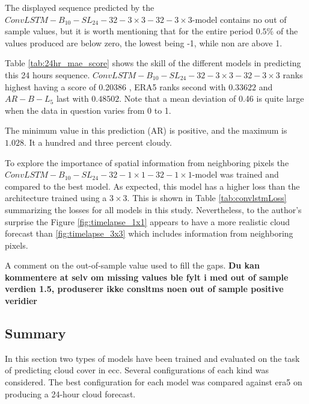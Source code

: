 The displayed sequence predicted by the $ConvLSTM-B_{10}-SL_{24}-32-3\times3-32-3 \times3$-model contains no out of sample values, but it is worth mentioning that for the entire period $0.5\%$ of the values produced are below zero, the lowest being -1, while non are above 1. 

Table \ref{tab:24hr_mae_score} shows the skill of the different models in predicting this 24 hours sequence. $ConvLSTM-B_{10}-SL_{24}-32-3\times3-32-3\times3$ ranks highest having a score of 0.20386
, ERA5 ranks second with  $0.33622$ and $AR-B-L_5$ last with  $0.48502$. Note that a mean deviation of 0.46 is quite large when the data in question varies from 0 to 1. 


The minimum value in this prediction (AR) is positive, and the maximum is $1.028$. It a hundred and three percent cloudy. 

To explore the importance of spatial information from neighboring pixels the $ConvLSTM-B_{10}-SL_{24}-32-1\times1-32-1 \times1$-model was trained and compared to the best model. As expected, this model has a higher loss than the architecture trained using a $3\times 3$. This is shown in Table \ref{tab:convlstmLoss} summarizing the losses for all models in this study. Nevertheless, to the author's surprise the Figure \ref{fig:timelapse_1x1} appears to have a more realistic cloud forecast than \ref{fig:timelapse_3x3} which includes information from neighboring pixels. 


A comment on the out-of-sample value used to fill the gaps.
\textbf{Du kan kommentere at selv om missing values ble fylt i med out of sample verdien 1.5, produserer ikke consltms noen out of sample positive veridier}




\subsection{Summary} \label{sec:summary_num}
In this section %
two types of models have been trained and evaluated on the task of predicting cloud cover in \acrshort{ecc}.
Several configurations of each kind was considered. The best configuration for each model was compared against \acrshort{era5} on producing a 24-hour cloud forecast.

